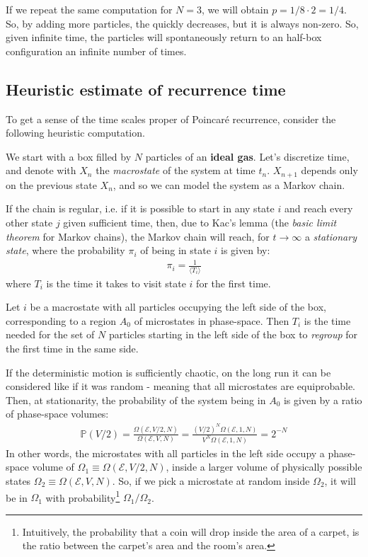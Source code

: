 \documentclass[../../main.tex]{subfiles}
\begin{document}
\medskip

If we repeat the same computation for $N=3$, we will obtain $p=1/8 \cdot 2 = 1/4$. So, by adding more particles, the  quickly decreases, but it is always non-zero. So, given infinite time, the particles will spontaneously return to an half-box configuration an infinite number of times.

\subsection{Heuristic estimate of recurrence time}
To get a sense of the time scales proper of Poincaré recurrence, consider the following heuristic computation.

\medskip

We start with a box filled by $N$ particles of an \textbf{ideal gas}. Let's discretize time, and denote with $X_n$ the \textit{macrostate} of the system at time $t_n$. $X_{n+1}$ depends only on the previous state $X_n$, and so we can model the system as a Markov chain. %

If the chain is regular, i.e. if it is possible to start in any state $i$ and reach every other state $j$ given sufficient time, then, due to Kac's lemma (the \textit{basic limit theorem} for Markov chains), the Markov chain will reach, for $t \to \infty$ a \textit{stationary state}, where the probability $\pi_i$ of being in state $i$ is given by:
\begin{align}\label{eqn:kaclemma}
    \pi_i = \frac{1}{\langle T_i \rangle} 
\end{align}
where $T_i$ is the time it takes to visit state $i$ for the first time. 

\medskip

Let $i$ be a macrostate with all particles occupying the left side of the box, corresponding to a region $A_0$ of microstates in phase-space. Then $T_i$ is the time needed for the set of $N$ particles starting in the left side of the box to \textit{regroup} for the first time in the same side.

\medskip

If the deterministic motion is sufficiently chaotic, on the long run it can be considered like if it was random - meaning that all microstates are equiprobable. Then, at stationarity, the probability of the system being in $A_0$ is given by a ratio of phase-space volumes:
\begin{align}\label{eqn:pvmezzo}
    \mathbb{P}(V/2) = \frac{\Omega(\mathcal{E}, V/2, N)}{\Omega(\mathcal{E}, V, N)} = \frac{(V/2)^N \Omega(\mathcal{E},1, N)}{V^N \Omega (\mathcal{E},1,N)} = 2^{-N}
\end{align}
In other words, the microstates with all particles in the left side occupy a phase-space volume of $\Omega_1 \equiv \Omega(\mathcal{E}, V/2, N)$, inside a larger volume of physically possible states $\Omega_2 \equiv \Omega(\mathcal{E}, V, N)$. So, if we pick a microstate at random inside $\Omega_2$, it will be in $\Omega_1$ with probability\footnote{Intuitively, the probability that a coin will drop inside the area of a carpet, is the ratio between the carpet's area and the room's area.} $\Omega_1/\Omega_2$. 
\end{document}
